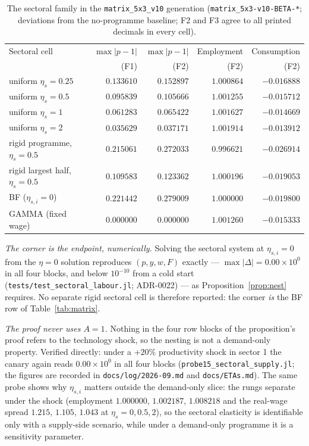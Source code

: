 \documentclass[11pt]{article}
\numberwithin{equation}{section}
\begin{document}
{\begin{table}[htbp]
\centering
\caption{The sectoral family in the \textcolor{revisionV3}{\texttt{matrix\_5x3\_v10}} generation
(\textcolor{revisionV3}{\texttt{matrix\_5x3-v10-BETA-*}}; deviations from the no-programme baseline;
F2 and F3 agree to all printed decimals in every cell).}
\label{tab:sectoral}
\begin{tabular}{lrrrr}
\toprule
Sectoral cell & $\max|p-1|$ & $\max|p-1|$ & Employment & Consumption \\
 & (F1) & (F2) & (F2) & (F2) \\
\midrule
uniform $\eta_s = 0.25$ & $0.133610$ & $0.152897$ & $1.000864$ & $-0.016888$ \\
uniform $\eta_s = 0.5$  & $0.095839$ & $0.105666$ & $1.001255$ & $-0.015712$ \\
uniform $\eta_s = 1$    & $0.061283$ & $0.065422$ & $1.001627$ & $-0.014669$ \\
uniform $\eta_s = 2$    & $0.035629$ & $0.037171$ & $1.001914$ & $-0.013912$ \\
\midrule
rigid programme, $\eta_s = 0.5$ & $0.215061$ & $0.272033$ & $0.996621$ & $-0.026914$ \\
rigid largest half, $\eta_s = 0.5$ & $0.109583$ & $0.123362$ & $1.000196$ & $-0.019053$ \\
\midrule
BF ($\eta_{s,i} = 0$) & $0.221442$ & $0.279009$ & $1.000000$ & $-0.019800$ \\
GAMMA (fixed wage) & $0.000000$ & $0.000000$ & $1.001260$ & $-0.015333$ \\
\bottomrule
\end{tabular}
\end{table}

\emph{The corner is the endpoint, numerically.} Solving the sectoral system at
$\eta_{s,i} = 0$ from the $\eta = 0$ solution reproduces $(p, y, w, F)$ exactly
--- $\max|\Delta| = 0.00 \times 10^0$ in all four blocks, and below $10^{-10}$
from a cold start (\textcolor{revisionV3}{\texttt{tests/test\_sectoral\_labour.jl};
ADR-0022}) --- as Proposition~\ref{prop:nest} requires. No separate
rigid sectoral cell is therefore reported: the corner \emph{is} the BF row of
Table~\ref{tab:matrix}.

\emph{The proof never uses $A = 1$.} Nothing in the four row blocks of the
proposition's proof refers to the technology shock, so the nesting is not a
demand-only property. Verified directly: under a $+20\%$ productivity shock in
sector 1 the canary again reads $0.00 \times 10^0$ in all four blocks
(\texttt{probe15\_sectoral\_supply.jl}; \textcolor{revisionV3}{the figures are
recorded in \texttt{docs/log/2026-09.md} and \texttt{docs/ETAs.md}}). The same probe shows why $\eta_{s,i}$
matters outside the demand-only slice: the rungs separate under the shock
(employment $1.000000$, $1.002187$, $1.008218$ and the real-wage spread
$1.215$, $1.105$, $1.043$ at $\eta_s = 0, 0.5, 2$), so the sectoral elasticity
is identifiable only with a supply-side scenario, while under a demand-only
programme it is a sensitivity parameter.
}
\end{document}
